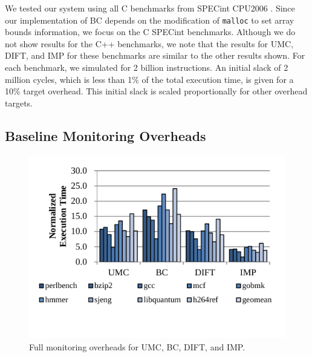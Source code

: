 We tested our system using all C benchmarks from SPECint
CPU2006 \cite{spec2006}. Since our implementation of BC depends on the
modification of {\tt malloc} to set array bounds information, we focus on the C
SPECint benchmarks. Although we do not
show results for the C++ benchmarks, we note that the results for UMC, DIFT, and IMP
for these benchmarks are similar to the other results shown. For each
benchmark, we simulated for 2 billion instructions. An initial slack of 2
million cycles, which is less than 1\% of
the total execution time, is given for a 10\% target overhead. This initial
slack is scaled proportionally for other overhead targets.

\subsection{Baseline Monitoring Overheads}

\begin{figure}
  \begin{center}
    \includegraphics[width=\columnwidth]{figs/data_full_mon.pdf}
    \vspace{-0.2in}
    \caption{Full monitoring overheads for UMC, BC, DIFT, and IMP.}
    \label{fig:evaluation.full_mon}
    \vspace{-0.1in}
  \end{center}
\end{figure} 

